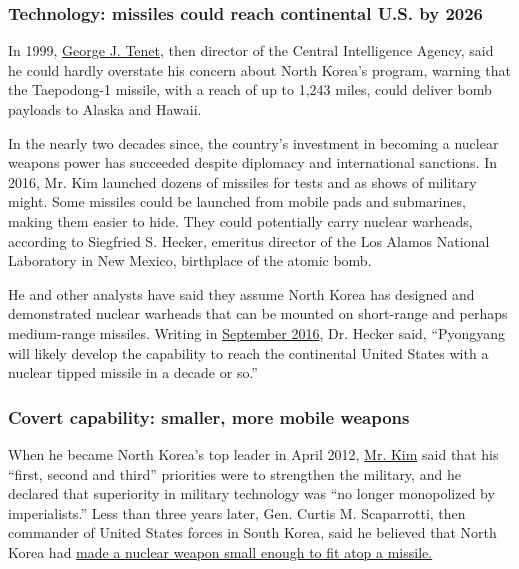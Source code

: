 \hypertarget{technology-missiles-could-reach-continental-us-by-2026}{%
\subsubsection{\texorpdfstring{\textbf{Technology: missiles could reach
continental U.S. by
2026}}{Technology: missiles could reach continental U.S. by 2026}}\label{technology-missiles-could-reach-continental-us-by-2026}}

In 1999,
\href{http://www.nytimes.com/1999/02/03/world/cia-sees-a-north-korean-missile-threat.html}{George
J. Tenet}, then director of the Central Intelligence Agency, said he
could hardly overstate his concern about North Korea's program, warning
that the Taepodong-1 missile, with a reach of up to 1,243 miles, could
deliver bomb payloads to Alaska and Hawaii.

In the nearly two decades since, the country's investment in becoming a
nuclear weapons power has succeeded despite diplomacy and international
sanctions. In 2016, Mr. Kim launched dozens of missiles for tests and as
shows of military might. Some missiles could be launched from mobile
pads and submarines, making them easier to hide. They could potentially
carry nuclear warheads, according to Siegfried S. Hecker, emeritus
director of the Los Alamos National Laboratory in New Mexico, birthplace
of the atomic bomb.

He and other analysts have said they assume North Korea has designed and
demonstrated nuclear warheads that can be mounted on short-range and
perhaps medium-range missiles. Writing in
\href{http://38north.org/2016/09/shecker091216/}{September 2016}, Dr.
Hecker said, ``Pyongyang will likely develop the capability to reach the
continental United States with a nuclear tipped missile in a decade or
so.''

\hypertarget{covert-capability-smaller-more-mobile-weapons}{%
\subsubsection{\texorpdfstring{\textbf{Covert capability: smaller, more
mobile
weapons}}{Covert capability: smaller, more mobile weapons}}\label{covert-capability-smaller-more-mobile-weapons}}

When he became North Korea's top leader in April 2012,
\href{http://topics.nytimes.com/top/reference/timestopics/people/k/kim_jongun/index.html?inline=nyt-per}{Mr.
Kim} said that his ``first, second and third'' priorities were to
strengthen the military, and he declared that superiority in military
technology was ``no longer monopolized by imperialists.'' Less than
three years later, Gen. Curtis M. Scaparrotti, then commander of United
States forces in South Korea, said he believed that North Korea had
\href{https://www.nytimes.com/2014/10/25/world/asia/us-commander-sees-key-nuclear-step-by-north-korea.html}{made
a nuclear weapon small enough to fit atop a missile.}

